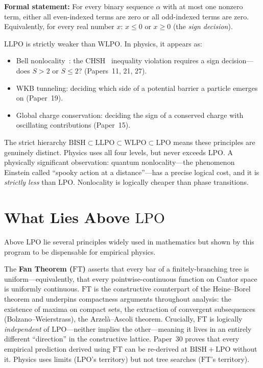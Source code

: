 \documentclass[11pt,a4paper]{report}
\theoremstyle{plain}
\theoremstyle{definition}
\theoremstyle{remark}
\newcommand{\BISH}{\mathrm{BISH}}
\newcommand{\LLPO}{\mathrm{LLPO}}
\newcommand{\WLPO}{\mathrm{WLPO}}
\newcommand{\LPO}{\mathrm{LPO}}
\newcommand{\FT}{\mathrm{FT}}
\begin{document}
\textbf{Formal statement:} For every binary sequence $\alpha$ with at most one nonzero term, either all even-indexed terms are zero or all odd-indexed terms are zero. Equivalently, for every real number $x$: $x \le 0$ or $x \ge 0$ (the \emph{sign decision}).

$\LLPO$ is strictly weaker than $\WLPO$. In physics, it appears as:
\begin{itemize}[nosep]
\item Bell nonlocality~\cite{Bell1964}: the CHSH~\cite{Clauser1969} inequality violation requires a sign decision---does $S > 2$ or $S \le 2$? (Papers~11, 21, 27).
\item WKB tunneling: deciding which side of a potential barrier a particle emerges on (Paper~19).
\item Global charge conservation: deciding the sign of a conserved charge with oscillating contributions (Paper~15).
\end{itemize}

The strict hierarchy $\BISH \subset \LLPO \subset \WLPO \subset \LPO$ means these principles are genuinely distinct. Physics uses all four levels, but never exceeds $\LPO$. A physically significant observation: quantum nonlocality---the phenomenon Einstein called ``spooky action at a distance''---has a precise logical cost, and it is \emph{strictly less} than $\LPO$. Nonlocality is logically cheaper than phase transitions.

\section{What Lies Above $\LPO$}

Above $\LPO$ lie several principles widely used in mathematics but shown by this program to be dispensable for empirical physics.

The \textbf{Fan Theorem ($\FT$)} asserts that every bar of a finitely-branching tree is uniform---equivalently, that every pointwise-continuous function on Cantor space is uniformly continuous. $\FT$ is the constructive counterpart of the Heine--Borel theorem and underpins compactness arguments throughout analysis: the existence of maxima on compact sets, the extraction of convergent subsequences (Bolzano--Weierstrass), the Arzel\`a--Ascoli theorem. Crucially, $\FT$ is logically \emph{independent} of $\LPO$---neither implies the other---meaning it lives in an entirely different ``direction'' in the constructive lattice. Paper~30 proves that every empirical prediction derived using $\FT$ can be re-derived at $\BISH+\LPO$ without it. Physics uses limits ($\LPO$'s territory) but not tree searches ($\FT$'s territory).
\end{document}
